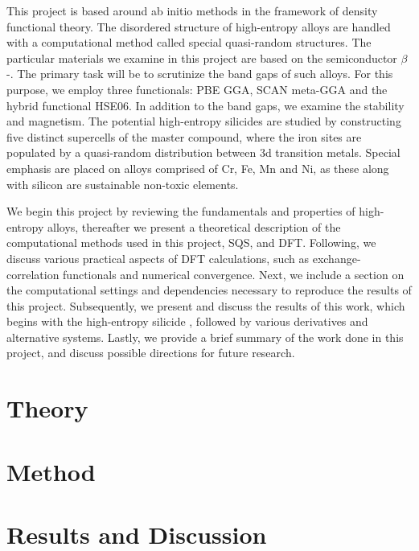 \documentclass[UKenglish]{ifimaster}  %
\begin{document}
This project is based around ab initio methods in the framework of density functional theory. The disordered structure of high-entropy alloys are handled with a computational method called special quasi-random structures. The particular materials we examine in this project are based on the semiconductor $\beta$-. The primary task will be to scrutinize the band gaps of such alloys. For this purpose, we employ three functionals: PBE GGA, SCAN meta-GGA and the hybrid functional HSE06. In addition to the band gaps, we examine the stability and magnetism. The potential high-entropy silicides are studied by constructing five distinct supercells of the master compound, where the iron sites are populated by a quasi-random distribution between 3d transition metals. Special emphasis are placed on alloys comprised of Cr, Fe, Mn and Ni, as these along with silicon are sustainable non-toxic elements.  

We begin this project by reviewing the fundamentals and properties of high-entropy alloys, thereafter we present a theoretical description of the computational methods used in this project, SQS, and DFT. Following, we discuss various practical aspects of DFT calculations, such as exchange-correlation functionals and numerical convergence. Next, we include a section on the computational settings and dependencies necessary to reproduce the results of this project. Subsequently, we present and discuss the results of this work, which begins with the high-entropy silicide , followed by various derivatives and alternative systems. Lastly, we provide a brief summary of the work done in this project, and discuss possible directions for future research.


\part{Theory}                    %




\part{Method}


 
\part{Results and Discussion}


\end{document}
